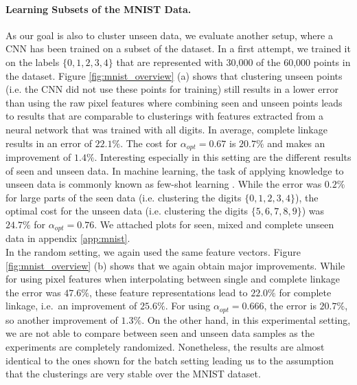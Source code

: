 \paragraph{Learning Subsets of the MNIST Data.} As our goal is also to cluster unseen data, we evaluate another setup, where a CNN has been trained on a subset of the dataset. In a first attempt, we trained it on the labels $\{0,1,2,3,4\}$ that are represented with 30,000 of the 60,000 points in the dataset. Figure \ref{fig:mnist_overview} (a) shows that clustering unseen points (i.e. the CNN did not use these points for training) still results in a lower error than using the raw pixel features where combining seen and unseen points leads to results that are comparable to clusterings with features extracted from a neural network that was trained with all digits. In average, complete linkage results in an error of $22.1\%$. The cost for $\alpha_{opt} = 0.67$ is $20.7\%$ and makes an improvement of $1.4\%$. Interesting especially in this setting are the different results of seen and unseen data. In machine learning, the task of applying knowledge to unseen data is commonly known as few-shot learning \cite{ren2018meta}. While the error was $0.2\%$ for large parts of the seen data (i.e. clustering the digits $\{0,1,2,3,4\}$), the optimal cost for the unseen data (i.e. clustering the digits $\{5,6,7,8,9\}$) was $24.7\%$ for $\alpha_{opt} = 0.76$. We attached plots for seen, mixed and complete unseen data in appendix \ref{app:mnist}.\\

In the random setting, we again used the same feature vectors. Figure \ref{fig:mnist_overview} (b) shows that we again obtain major improvements. While for using pixel features when interpolating between single and complete linkage the error was $47.6\%$, these feature representations lead to $22.0\%$ for complete linkage, i.e.\ an improvement of $25.6\%$. For using $\alpha_{opt} = 0.666$, the error is $20.7\%$, so another improvement of $1.3\%$. On the other hand, in this experimental setting, we are not able to compare between seen and unseen data samples as the experiments are completely randomized. Nonetheless, the results are almost identical to the ones shown for the batch setting leading us to the assumption that the clusterings are very stable over the MNIST dataset.

